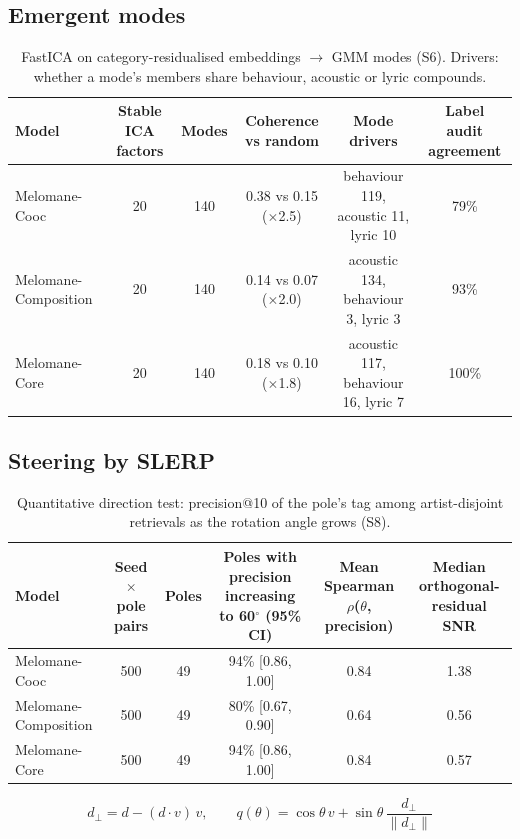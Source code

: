 \documentclass[11pt,a4paper]{article}
\begin{document}
\subsection*{Emergent modes}
\begin{table}[h]\centering\small
\begin{tabular}{lccccc}
\toprule
\textbf{Model} & \textbf{Stable ICA factors} & \textbf{Modes} & \textbf{Coherence vs random} & \textbf{Mode drivers} & \textbf{Label audit agreement} \\
\midrule
Melomane-Cooc & 20 & 140 & 0.38 vs 0.15 ($\times$2.5) & behaviour 119, acoustic 11, lyric 10 & 79\% \\
Melomane-Composition & 20 & 140 & 0.14 vs 0.07 ($\times$2.0) & acoustic 134, behaviour 3, lyric 3 & 93\% \\
Melomane-Core & 20 & 140 & 0.18 vs 0.10 ($\times$1.8) & acoustic 117, behaviour 16, lyric 7 & 100\% \\
\bottomrule
\end{tabular}
\caption{FastICA on category-residualised embeddings $\rightarrow$ GMM modes (S6). Drivers: whether a mode's members share behaviour, acoustic or lyric compounds.}
\end{table}

\subsection*{Steering by SLERP}
\begin{table}[h]\centering\small
\begin{tabular}{lccccc}
\toprule
\textbf{Model} & \textbf{Seed$\times$pole pairs} & \textbf{Poles} & \textbf{Poles with precision increasing to 60$^\circ$ (95\% CI)} & \textbf{Mean Spearman $\rho$($\theta$, precision)} & \textbf{Median orthogonal-residual SNR} \\
\midrule
Melomane-Cooc & 500 & 49 & 94\% [0.86, 1.00] & 0.84 & 1.38 \\
Melomane-Composition & 500 & 49 & 80\% [0.67, 0.90] & 0.64 & 0.56 \\
Melomane-Core & 500 & 49 & 94\% [0.86, 1.00] & 0.84 & 0.57 \\
\bottomrule
\end{tabular}
\caption{Quantitative direction test: precision@10 of the pole's tag among artist-disjoint retrievals as the rotation angle grows (S8).}
\end{table}

\[ d_\perp = d - (d\cdot v)\,v,\qquad q(\theta) = \cos\theta\, v + \sin\theta\, \frac{d_\perp}{\lVert d_\perp\rVert} \]
\end{document}
